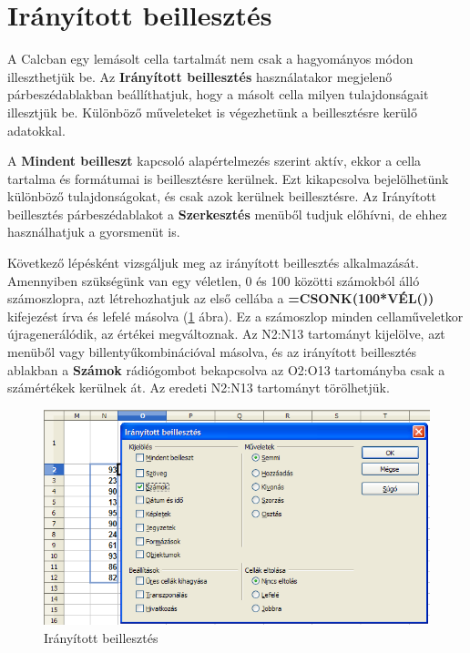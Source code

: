 \section{Irányított beillesztés}

A Calcban egy lemásolt cella tartalmát nem csak a hagyományos
módon illeszthetjük be. Az \textbf{Irányított beillesztés}
használatakor megjelenő párbeszédablakban beállíthatjuk,
hogy a másolt cella milyen tulajdonságait illesztjük be.
Különböző műveleteket is végezhetünk a
beillesztésre kerülő adatokkal.

A \textbf{Mindent beilleszt} kapcsoló alapértelmezés szerint
aktív, ekkor a cella tartalma és formátumai is beillesztésre
kerülnek. Ezt kikapcsolva bejelölhetünk különböző
tulajdonságokat, és csak azok kerülnek beillesztésre. Az
Irányított beillesztés párbeszédablakot a
\textbf{Szerkesztés} menüből tudjuk előhívni, de ehhez
használhatjuk a gyorsmenüt is.

Következő lépésként vizsgáljuk meg az irányított beillesztés alkalmazását.
Amennyiben szükségünk van egy véletlen, 0 és 100 közötti
számokból álló számoszlopra, azt létrehozhatjuk az első
cellába a \textbf{=CSONK(100*VÉL())} kifejezést
írva és lefelé másolva (\ref{IrányítottBeillesztés} ábra).
Ez a számoszlop minden
cellaműveletkor újragenerálódik, az értékei
megváltoznak. Az N2:N13 tartományt kijelölve, azt menüből 
vagy billentyűkombinációval másolva, és az
irányított beillesztés ablakban a \textbf{Számok}
rádiógombot bekapcsolva az O2:O13 tartományba csak a
számértékek kerülnek át. Az eredeti N2:N13 tartományt
törölhetjük.

\begin{figure}[!h]
\begin{center}
\includegraphics[width=15.999cm]{oocalcv2-img160.png}
\caption{Irányított beillesztés}\label{IrányítottBeillesztés}
\end{center}
\end{figure}


